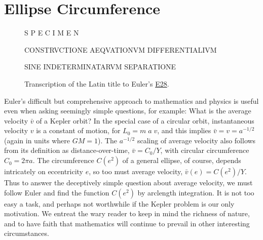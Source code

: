 \documentclass[nofootinbib,preprint]{revtex4-1}
\begin{document}
\section{Ellipse Circumference}
\begin{figure}[t]
\begin{center}
{\huge {}\selectfont S P E C I M E N}

CONSTRVCTIONE AEQVATIONVM DIFFERENTIALIVM 

SINE INDETERMINATARVM SEPARATIONE
\caption{Transcription of the Latin title to Euler's \href{http://eulerarchive.maa.org/pages/E028.html}{E28}.}
\end{center}
\end{figure}

Euler's difficult but comprehensive approach to mathematics and physics is useful 
even when asking seemingly simple questions, for example: What is the average velocity 
$\bar{v}$ of a Kepler orbit? In the special case of a circular orbit, instantaneous 
velocity $v$ is a constant of motion, for $ L_0 = m \; a \; v$, and this implies 
$\bar{v}= v = a^{-1/2}$ (again in units where $GM=1$). 
The $a^{-1/2}$ scaling of average velocity also follows from its definition as 
distance-over-time, ${\bar{v}=C_0/Y}$, with circular circumference $C_0 = 2\pi a$. 
The circumference $C(e^2)$ of a general ellipse, of course, depends intricately on 
eccentricity $e$, so too must average velocity, ${\bar{v}(e) = C(e^2)/Y}$. Thus
to answer the deceptively simple question about average velocity, we must follow 
Euler and find the function $C(e^2)$ by arclength integration. It is not too easy a 
task, and perhaps not worthwhile if the Kepler problem is our only motivation. 
We entreat the wary reader to keep in mind the richness of nature, and to have 
faith that mathematics will continue to prevail in other interesting circumstances.
\end{document}
